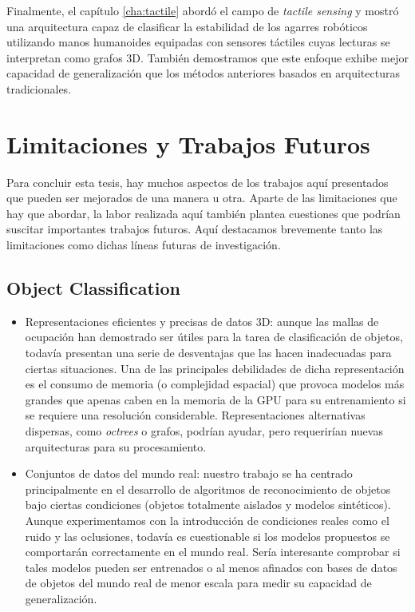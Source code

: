 Finalmente, el capítulo \ref{cha:tactile} abordó el campo de \emph{tactile sensing} y mostró una arquitectura capaz de clasificar la estabilidad de los agarres robóticos utilizando manos humanoides equipadas con sensores táctiles cuyas lecturas se interpretan como grafos \acs{3D}. También demostramos que este enfoque exhibe mejor capacidad de generalización que los métodos anteriores basados en arquitecturas tradicionales.

\section{Limitaciones y Trabajos Futuros}
\label{cha:conclusion_sp:sec:future}

Para concluir esta tesis, hay muchos aspectos de los trabajos aquí presentados que pueden ser mejorados de una manera u otra. Aparte de las limitaciones que hay que abordar, la labor realizada aquí también plantea cuestiones que podrían suscitar importantes trabajos futuros. Aquí destacamos brevemente tanto las limitaciones como dichas líneas futuras de investigación.

\subsection{Object Classification}

\begin{itemize}
    \item Representaciones eficientes y precisas de datos 3D: aunque las mallas de ocupación han demostrado ser útiles para la tarea de clasificación de objetos, todavía presentan una serie de desventajas que las hacen inadecuadas para ciertas situaciones. Una de las principales debilidades de dicha representación es el consumo de memoria (o complejidad espacial) que provoca modelos más grandes que apenas caben en la memoria de la \ac{GPU} para su entrenamiento si se requiere una resolución considerable. Representaciones alternativas dispersas, como \emph{octrees} o grafos, podrían ayudar, pero requerirían nuevas arquitecturas para su procesamiento.
    \item Conjuntos de datos del mundo real: nuestro trabajo se ha centrado principalmente en el desarrollo de algoritmos de reconocimiento de objetos bajo ciertas condiciones (objetos totalmente aislados y modelos sintéticos). Aunque experimentamos con la introducción de condiciones reales como el ruido y las oclusiones, todavía es cuestionable si los modelos propuestos se comportarán correctamente en el mundo real. Sería interesante comprobar si tales modelos pueden ser entrenados o al menos afinados con bases de datos de objetos del mundo real de menor escala para medir su capacidad de generalización.
\end{itemize}

